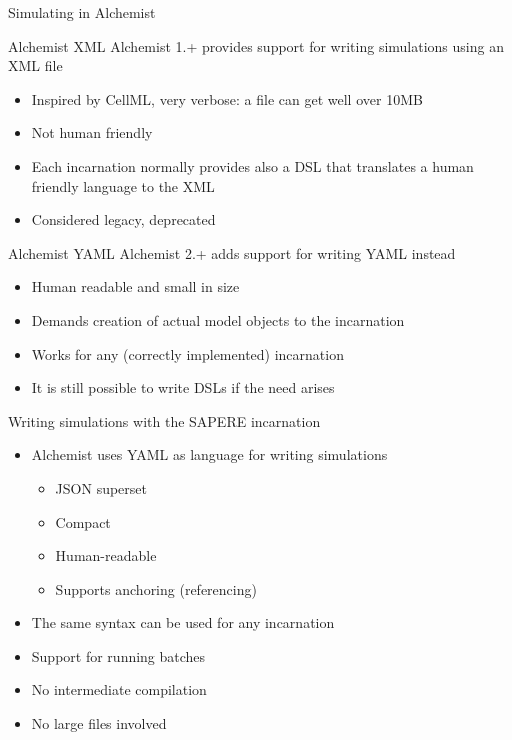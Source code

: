 \documentclass[presentation]{beamer}
\begin{document}
\begin{frame}{Simulating in Alchemist}
 \begin{block}{Alchemist XML}
    Alchemist 1.+ provides support for writing simulations using an XML file
  \begin{itemize}
   \item Inspired by CellML, very verbose: a file can get well over 10MB
   \item Not human friendly
   \item Each incarnation normally provides also a DSL that translates a human friendly language to the XML
   \item Considered legacy, deprecated
  \end{itemize}
 \end{block}
 \begin{block}{Alchemist YAML}
    Alchemist 2.+ adds support for writing YAML instead
  \begin{itemize}
   \item Human readable and small in size
   \item Demands creation of actual model objects to the incarnation
   \item Works for any (correctly implemented) incarnation
   \item It is still possible to write DSLs if the need arises
  \end{itemize}
 \end{block}
\end{frame}

\begin{frame}{Writing simulations with the SAPERE incarnation}
	\begin{itemize}
		\item Alchemist uses YAML as language for writing simulations
		\begin{itemize}
			\item JSON superset
			\item Compact
			\item Human-readable
			\item Supports anchoring (referencing)
		\end{itemize}
		\item The same syntax can be used for any incarnation
		\item Support for running batches
		\item No intermediate compilation
		\item No large files involved
	\end{itemize}
\end{frame}
\end{document}
